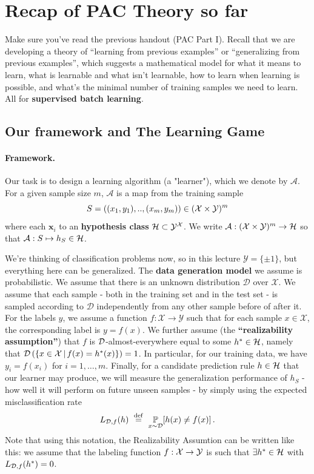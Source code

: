 
\section{Recap of PAC Theory so far}


Make sure you've read the previous handout (PAC Part I). Recall that we are
developing a theory of ``learning from previous examples'' or ``generalizing
from previous examples'', which suggests a mathematical model for what it
means to learn, what is learnable and what isn't learnable, how to learn when
learning is possible, and what's the minimal number of training samples we need
to learn. All for {\bf supervised batch learning}.

\subsection*{Our framework and The Learning Game}



\paragraph{Framework.}

 Our task is to design a learning algorithm (a "learner"), which we denote by $\mathcal{A}$. For a given sample size $m$, $\mathcal{A}$  is a map from the training sample 
\[S=((x_1,y_1),..,(x_m,y_m)) \in (\mathcal{X}\times \mathcal{Y})^m\]
where each $\mathbf{x}_i$
to an {\bf hypothesis class}  $\mathcal{H}\subset \mathcal{Y}^{\mathcal{X}}$. We write
$\mathcal{A}:(\mathcal{X}\times\mathcal{Y})^m\to \mathcal{H}$ so that $\mathcal{A}:S\mapsto h_S\in\mathcal{H}$.

We're thinking of classification problems now, so in this lecture $\mathcal{Y}=\{\pm 1\}$, but everything here can be generalized.
The {\bf data generation model} we assume is probabilistic. 
We assume that there is an unknown distribution $\mathcal{D}$ over
$\mathcal{X}$.
 We assume that each sample - both in the training set and in the test set - is sampled
 according to $\mathcal{D}$ independently from any other sample before of after
 it. For the labels $y$, we assume a function $f:\mathcal{X}\to\mathcal{Y}$ such
 that for each sample $x\in\mathcal{X}$, the corresponding label is $y=f(x)$. We
 further assume (the {\bf ``realizability assumption''}) that $f$ is
 $\mathcal{D}$-almost-everywhere equal to some $h^*\in\mathcal{H}$, namely that $\mathcal{D}\left(
   \left\{ x\in\mathcal{X}\,|\, f(x)=h^*(x)  \right\}
 \right)=1$.
In particular, for our training data, we have $y_i = f(x_i)$ for $i=1,\ldots,m$. 
Finally, for a candidate prediction rule $h\in\mathcal{H}$ that our learner may produce,
we will measure the generalization performance of $h_S$ - how well it will perform on future unseen samples - by simply using the expected misclassification rate 
$$
L_{\mathcal{D},f}(h) ~\stackrel{\mathrm{def}}{=}~ \operatorname*{\mathbb{P}}_{x \sim \mathcal{D}}[h(x) \neq f(x)] \,.
$$
Note that using this notation, the Realizability Assumtion can be written like
this: we assume that the labeling function $f:\mathcal{X}\to\mathcal{Y} $ is such that
$\exists h^*\in\mathcal{H}$ with $L_{\mathcal{D},f}(h^*)=0$.


